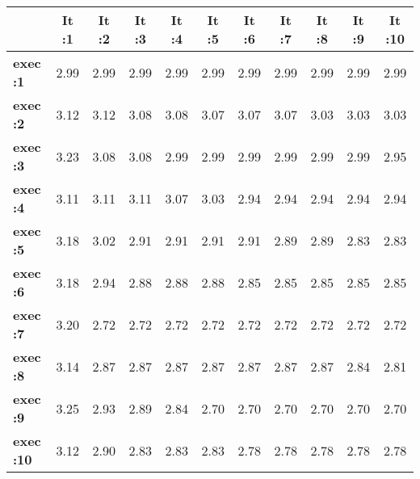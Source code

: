 \begin{tiny}\begin{tabular}{|l|c|c|c|c|c|c|c|c|c|c|}
\hline
&\textbf{It :1}&\textbf{It :2}&\textbf{It :3}&\textbf{It :4}&\textbf{It :5}&\textbf{It :6}&\textbf{It :7}&\textbf{It :8}&\textbf{It :9}&\textbf{It :10}\\\hline
\textbf{exec :1}&2.99&2.99&2.99&2.99&2.99&2.99&2.99&2.99&2.99&2.99\\\hline
\textbf{exec :2}&3.12&3.12&3.08&3.08&3.07&3.07&3.07&3.03&3.03&3.03\\\hline
\textbf{exec :3}&3.23&3.08&3.08&2.99&2.99&2.99&2.99&2.99&2.99&2.95\\\hline
\textbf{exec :4}&3.11&3.11&3.11&3.07&3.03&2.94&2.94&2.94&2.94&2.94\\\hline
\textbf{exec :5}&3.18&3.02&2.91&2.91&2.91&2.91&2.89&2.89&2.83&2.83\\\hline
\textbf{exec :6}&3.18&2.94&2.88&2.88&2.88&2.85&2.85&2.85&2.85&2.85\\\hline
\textbf{exec :7}&3.20&2.72&2.72&2.72&2.72&2.72&2.72&2.72&2.72&2.72\\\hline
\textbf{exec :8}&3.14&2.87&2.87&2.87&2.87&2.87&2.87&2.87&2.84&2.81\\\hline
\textbf{exec :9}&3.25&2.93&2.89&2.84&2.70&2.70&2.70&2.70&2.70&2.70\\\hline
\textbf{exec :10}&3.12&2.90&2.83&2.83&2.83&2.78&2.78&2.78&2.78&2.78\\\hline
\end{tabular}
\end{tiny}